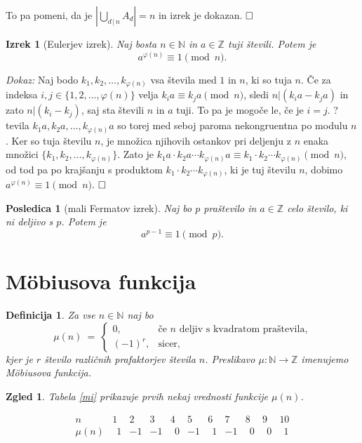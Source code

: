 \documentclass[a4paper,12pt]{article}
\def\N{\mathbb{N}} %
\def\Z{\mathbb{Z}} %
\def\qed{$\hfill\Box$}   %
\newtheorem{izrek}{Izrek}
\newtheorem{posledica}{Posledica}
\newtheorem{definicija}{Definicija}
\newtheorem{zgled}{Zgled}
\begin{document}
To pa pomeni, da je $\left|\bigcup_{d\,|\,n} A_d\right| = n$ in izrek je dokazan. \qed

\begin{izrek}[Eulerjev izrek]
Naj bosta $n \in \N$ in $a \in \Z$ tuji števili. Potem je
\[
a^{\varphi(n)} \equiv 1 \pmod{n}.
\]
\end{izrek}

\noindent
{\em Dokaz:\/} Naj bodo $k_1, k_2, \ldots, k_{\varphi(n)}$ vsa števila med $1$ in $n$, ki so tuja $n$. Če za indeksa $i,j \in \{1,2,\ldots,\varphi(n)\}$ velja $k_i a \equiv k_j a \!\!\!\pmod{n}$, sledi $n | (k_i a - k_j a)$ in zato $n | (k_i - k_j)$, saj sta števili $n$ in $a$ tuji. To pa je mogoče le, če je $i = j$. ? tevila  $k_1 a, k_2 a, \ldots, k_{\varphi(n)} a$ so torej med seboj paroma nekongruentna po modulu $n$. Ker so tuja številu $n$, je množica njihovih ostankov pri deljenju z $n$ enaka množici $\{k_1, k_2, \ldots, k_{\varphi(n)}\}$. Zato je $k_1 a\cdot k_2 a\cdots k_{\varphi(n)} a \equiv k_1\cdot k_2 \cdots k_{\varphi(n)} \pmod{n}$, od tod pa po krajšanju s produktom $ k_1\cdot k_2 \cdots k_{\varphi(n)}$, ki je tuj številu $n$, dobimo $a^{\varphi(n)} \equiv 1 \!\!\!\pmod{n}$. \qed

\begin{posledica}[mali Fermatov izrek]
Naj bo $p$ praštevilo in $a \in \Z$ celo število, ki ni deljivo s $p$. Potem je
\[
a^{p-1} \equiv 1 \pmod{p}.
\]
\end{posledica}



\section{M\"obiusova funkcija}


\begin{definicija}
Za vse $n \in \N$ naj bo
\[
\mu(n)\ =\ \left\{
\begin{array}{cl}
0, & \mbox{če\ } n \mbox{\ deljiv s kvadratom praštevila,} \\
(-1)^r, & \mbox{sicer,}
\end{array}
\right.
\]
kjer je $r$ število različnih prafaktorjev števila $n$.
Preslikavo $\mu: \N \to \Z$ imenujemo \em{M\"obiusova funkcija}.
\end{definicija}

\begin{zgled}
Tabela \ref{mi} prikazuje prvih nekaj vrednosti funkcije $\mu(n)$. 
\begin{table}[h]
\[
\begin{array}{c|*{10}{r}}
   n   & 1 & 2 & 3 & 4 & 5 & 6 & 7 & 8 & 9 & 10 \\
\hline
\mu(n) & \ \ 1 & -1 & -1 & \ \ 0 & -1 & \ \ 1 & -1 & \ \ 0 & \ \ 0 & \ \ 1
\end{array}
\]
\caption{Vrednosti funkcije $\mu(n)$}\label{mi}
\end{table}
\end{zgled}
\end{document}

